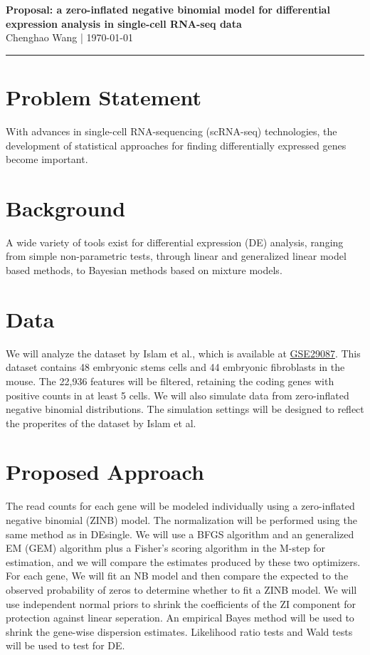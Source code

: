 \documentclass[11pt]{article}
\begin{document}
\begin{center}
{\large\bfseries Proposal: a zero-inflated negative binomial model for differential expression analysis in single-cell RNA-seq data}\\[-0.2em]
{\normalsize Chenghao Wang \quad | \quad \today}
\end{center}
\vspace{-0.2em}
\hrule
\vspace{0.35em}

\section*{Problem Statement}
With advances in single-cell RNA-sequencing (scRNA-seq) technologies,
the development of statistical approaches for finding differentially
expressed genes become important.

\section*{Background}
A wide variety of tools exist for differential expression (DE)
analysis, ranging from simple non-parametric tests\cite{hao2024dictionary}, through
linear\cite{law_voom_2014}\cite{finak_mast_2015} and generalized linear model\cite{love_moderated_2014}\cite{mccarthy_differential_2012}\cite{miao_desingle_2018} 
based methods, to Bayesian methods
based on mixture models\cite{kharchenko_bayesian_2014}\cite{korthauer_statistical_2016}.

\section*{Data}
We will analyze the dataset by Islam et al.\cite{islam2011characterization}, which is
available at \href{https://www.ncbi.nlm.nih.gov/geo/query/acc.cgi?acc=GSE29087}{GSE29087}.
This dataset contains 48 embryonic stems cells and 44 embryonic fibroblasts
in the mouse. The 22,936 features will be filtered, retaining the coding
genes with positive counts in at least 5 cells. We will also simulate data
from zero-inflated negative binomial distributions.
The simulation settings will be designed to reflect the properites
of the dataset by Islam et al.

\section*{Proposed Approach} 
The read counts for each gene will be modeled individually using a zero-inflated negative binomial (ZINB) model.
The normalization will be performed using the same method as in DEsingle\cite{miao_desingle_2018}.
We will use a BFGS algorithm and an generalized EM (GEM) algorithm plus
a Fisher's scoring algorithm in the M-step for estimation,
and we will compare the estimates produced by these two optimizers.
For each gene, We will fit an NB model and then compare the
expected to the observed probability of zeros to determine whether to
fit a ZINB model.
We will use independent normal priors to shrink the coefficients of
the ZI component for protection against linear seperation.
An empirical Bayes method will be used to shrink the gene-wise dispersion estimates.
Likelihood ratio tests and Wald tests will be used to test for DE.
\end{document}
